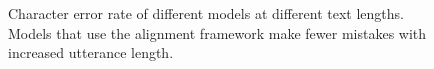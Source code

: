 \begin{figure}[h]
%     
    
%     
 \begin{subfigure}{\linewidth}
    
    \vspace{-1.0\baselineskip}
 \end{subfigure}
%     
 \caption{Character error rate of different models at different text lengths. Models that use the alignment framework make fewer mistakes with increased utterance length.}
 \label{fig:cer}
 \vspace*{-1.5\baselineskip}
\end{figure}